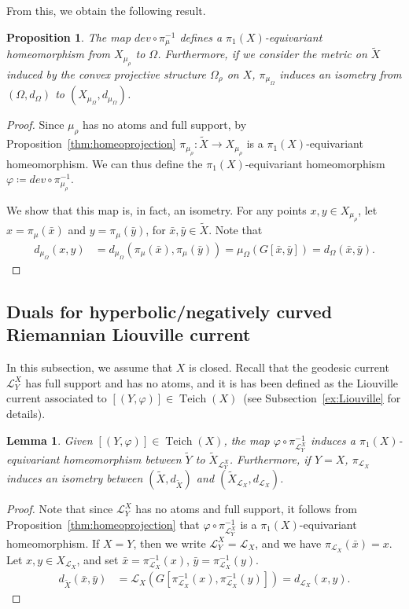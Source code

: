 \documentclass[12pt,article]{amsart}
\numberwithin{equation}{section}
\numberwithin{figure}{section}
\newtheorem{lemma}[equation]{Lemma}
\newtheorem{proposition}[equation]{Proposition}
\theoremstyle{definition}
\theoremstyle{plain}
\newcommand\dev{\ensuremath{\mathit{dev}}}
\DeclareMathOperator{\Teich}{Teich}
\newcommand*{\wt}[1]{\widetilde{#1}}
\begin{document}
From this, we obtain the following result.

\begin{proposition}
The map $\dev \circ \pi_{\mu}^{-1}$ defines a $\pi_1(X)$-equivariant homeomorphism from $X_{\mu_{\rho}}$ to $\Omega$. 
Furthermore, if we consider the metric on $\wt{X}$ induced by the convex projective structure $\Omega_{\rho}$ on $X$, $\pi_{\mu_{\Omega}}$ induces an isometry from $(\Omega, d_\Omega)$ to $(X_{\mu_{\Omega}}, d_{\mu_{\Omega}})$.
\label{prop:convexproj}
\end{proposition}
\begin{proof}
Since $\mu_\rho$ has no atoms and full support, by Proposition~\ref{thm:homeoprojection} $\pi_{\mu_\rho} \colon \wt{X} \to X_{\mu_\rho}$ is a $\pi_1(X)$-equivariant homeomorphism.
We can thus define the $\pi_1(X)$-equivariant homeomorphism~ $\varphi \coloneqq \dev \circ \pi_{\mu_\rho}^{-1}$.

We show that this map is, in fact, an isometry.
For any points $x,y \in X_{\mu_{\rho}}$, let
$x=\pi_{\mu}(\bar{x})$ and $y=\pi_{\mu}(\bar{y})$, for $\bar{x},\bar{y} \in \wt{X}$.
Note that
\begin{align*}
d_{\mu_{\Omega}}(x,y)&=
d_{\mu_{\Omega}}(\pi_{\mu}(\bar{x}),\pi_{\mu}(\bar{y}))=\mu_{\Omega}(G[\bar{x},\bar{y}])=d_{\Omega}(\bar{x},\bar{y}).
\end{align*}
\end{proof}

\subsection{Duals for hyperbolic/negatively curved Riemannian Liouville current}
\label{ex:LiouvilleDual}
In this subsection, we assume that $X$ is closed.
Recall that the geodesic current $\mathcal{L}_Y^X$  has full support and has no atoms, and it is has been defined as the Liouville current associated to $[(Y,\varphi)] \in \Teich(X)$~(see Subsection~\ref{ex:Liouville} for details).

\begin{lemma}
Given $[(Y,\varphi)] \in \Teich(X)$, the map $\varphi \circ \pi_{\mathcal{L}_Y^X}^{-1}$ induces a $\pi_1(X)$-equivariant homeomorphism between $\wt{Y}$ to
$\wt{X}_{\mathcal{L}_Y^X}$. Furthermore, if $Y=X$, $\pi_{\mathcal{L}_X}$ induces an isometry between $(\wt{X},d_{\wt{X}})$ and $(\wt{X}_{\mathcal{L}_X},d_{\mathcal{L}_X})$.

\label{lem:liouville}
\end{lemma}
\begin{proof}
Note that since $\mathcal{L}_Y^X$ has no atoms and full support, it follows from Proposition~\ref{thm:homeoprojection} that $\varphi \circ \pi_{\mathcal{L}_Y^X}^{-1}$ is a $\pi_1(X)$-equivariant homeomorphism. If $X=Y$, then we write $\mathcal{L}_Y^X=\mathcal{L}_X$, and we have $\pi_{\mathcal{L}_X}(\bar{x})=x$.
Let $x,y \in X_{\mathcal{L}_X}$, and set $\bar{x}=\pi_{\mathcal{L}_X}^{-1}(x)$, $\bar{y}=\pi_{\mathcal{L}_X}^{-1}(y)$.
\begin{align*}
d_{\wt{X}}(\bar{x},\bar{y})&=\mathcal{L}_{X}(G[ \pi_{\mathcal{L}_X}^{-1}(x), \pi_{\mathcal{L}_X}^{-1}
(y)])=d_{\mathcal{L}_X}(x,y).
\end{align*}
\end{proof}
\end{document}
